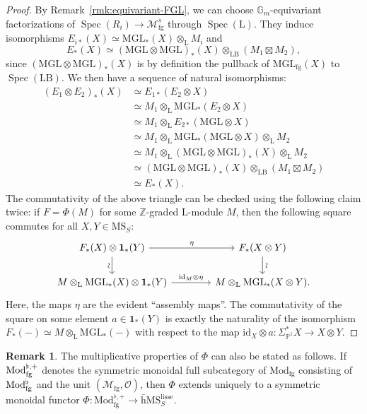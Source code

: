 \documentclass{amsart}
\numberwithin{equation}{section}
\theoremstyle{plain}
\theoremstyle{definition}
\newtheorem{remark}[equation]{Remark}
\let\scr=\mathcal
\let\bb=\mathbb
\def\Z{\bb Z}
\def\P{\bb P}
\def\1{\mathbf 1}
\def\G{\mathbb G}
\def\ph{\mathord-}
\def\L{\mathrm{L}{}}
\def\LB{\mathrm{LB}{}}
\def\id{\mathrm{id}}
\DeclareMathOperator{\Spec}{Spec}
\let\cat=\mathrm
\def\MGL{\mathrm{MGL}}
\def\Mod{\cat{M}\mathrm{od}{}}
\def\MS{\mathrm{MS}}
\def\Ab{\mathrm{A}\mathrm{b}}
\def\Fun{\mathrm{Fun}}
\def\w{\bar{\mathrm{h}}}
\def\fg{\mathrm{fg}}
\def\lisse{\mathrm{lisse}}
\begin{document}
\begin{proof}
	By Remark~\ref{rmk:equivariant-FGL}, we can choose $\G_m$-equivariant factorizations of $\Spec(R_i)\to\scr M_\fg^s$ through $\Spec(\L)$. They induce isomorphisms $E_{i*}(X) \simeq \MGL_*(X)\otimes_\L M_i$ and
	\[
	E_*(X) \simeq (\MGL\otimes\MGL)_*(X)\otimes_{\LB} (M_1\boxtimes M_2),
	\]
	since $(\MGL\otimes\MGL)_*(X)$ is by definition the pullback of $\MGL_\fg(X)$ to $\Spec(\LB)$.
	We then have a sequence of natural isomorphisms:
	\begin{align*}
		(E_1\otimes E_2)_*(X) & \simeq E_{1*}(E_2\otimes X) \\
		&\simeq M_1\otimes_\L\MGL_*(E_2\otimes X)\\
		& \simeq M_1\otimes_\L E_{2*}(\MGL\otimes X)\\
		& \simeq M_1\otimes_\L\MGL_*(\MGL\otimes X)\otimes_\L M_2   \\
		& \simeq M_1\otimes_\L(\MGL\otimes\MGL)_*(X)\otimes_\L M_2  \\
		& \simeq (\MGL\otimes\MGL)_*(X)\otimes_\LB(M_1\boxtimes M_2) \\
		& \simeq E_*(X).
	\end{align*}
	The commutativity of the above triangle can be checked using the following claim twice: if $F=\Phi(M)$ for some $\Z$-graded $\L$-module $M$, then the following square commutes for all $X,Y\in\MS_S$:
	\[
	\begin{tikzcd}[column sep=4em]
		F_*(X)\otimes \1_*(Y) \ar{d}[swap,sloped]{\sim} \ar{r}{\eta} & F_*(X\otimes Y) \ar{d}[sloped]{\sim} \\
		M\otimes_\L\MGL_*(X)\otimes \1_*(Y) \ar{r}{\id_M\otimes \eta} & M\otimes_\L\MGL_*(X\otimes Y).
	\end{tikzcd}
	\]
	Here, the maps $\eta$ are the evident ``assembly maps''. The commutativity of the square on some element $a\in \1_{*}(Y)$ is exactly the naturality of the isomorphism $F_*(\ph)\simeq M\otimes_\L \MGL_*(\ph)$ with respect to the map $\id_X\otimes a\colon \Sigma_{\P^1}^*X\to X\otimes Y$.
\end{proof}

\begin{remark}
	The multiplicative properties of $\Phi$ can also be stated as follows. If $\Mod_{\smash[b]{\fg}}^{\flat,+}$ denotes the symmetric monoidal full subcategory of $\Mod_\fg$ consisting of $\Mod_{\smash[b]{\fg}}^\flat$ and the unit $(\scr M_\fg,\scr O)$, then $\Phi$ extends uniquely to a symmetric monoidal functor $\Phi\colon \Mod_\fg^{\flat,+}\to\w\MS_S^\lisse$.
\end{remark}
\end{document}
